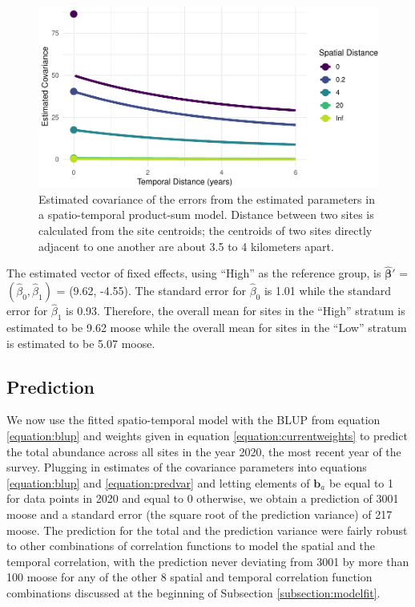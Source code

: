 \documentclass[smallextended]{svjour3}       %
\begin{document}
\begin{figure}
\centering
\includegraphics{preprint_springer_files/figure-latex/covplot-1.pdf}
\caption{\label{fig:covplot} Estimated covariance of the errors from the
estimated parameters in a spatio-temporal product-sum model. Distance
between two sites is calculated from the site centroids; the centroids
of two sites directly adjacent to one another are about 3.5 to 4
kilometers apart.}
\end{figure}

The estimated vector of fixed effects, using ``High'' as the reference
group, is \(\bm{\hat{\beta}}'\) = \((\hat{\beta}_0, \hat{\beta}_1)\) =
(9.62, -4.55). The standard error for \(\hat{\beta}_0\) is 1.01 while
the standard error for \(\hat{\beta}_1\) is 0.93. Therefore, the overall
mean for sites in the ``High'' stratum is estimated to be 9.62 moose
while the overall mean for sites in the ``Low'' stratum is estimated to
be 5.07 moose.

\hypertarget{prediction}{%
\subsection{Prediction}\label{prediction}}

We now use the fitted spatio-temporal model with the BLUP from equation
\ref{equation:blup} and weights given in equation
\ref{equation:currentweights} to predict the total abundance across all
sites in the year 2020, the most recent year of the survey. Plugging in
estimates of the covariance parameters into equations
\ref{equation:blup} and \ref{equation:predvar} and letting elements of
\(\mathbf{b}_a\) be equal to 1 for data points in 2020 and equal to 0
otherwise, we obtain a prediction of 3001 moose and a standard error
(the square root of the prediction variance) of 217 moose. The
prediction for the total and the prediction variance were fairly robust
to other combinations of correlation functions to model the spatial and
the temporal correlation, with the prediction never deviating from 3001
by more than 100 moose for any of the other 8 spatial and temporal
correlation function combinations discussed at the beginning of
Subsection \ref{subsection:modelfit}.
\end{document}

